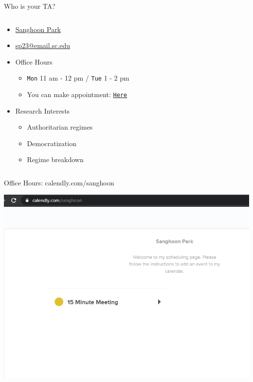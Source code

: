 \documentclass[xcolor=dvipsnames]{beamer}
\begin{document}
\begin{frame}[fragile]{Who is your TA?}
\begin{columns}[T]
			\begin{column}{0.6\textwidth}
				\begin{itemize}
					\item \href{shpark.netlify.app}{Sanghoon Park}
					\item \href{sp23@email.sc.edu}{sp23@email.sc.edu}
					\item Office Hours
					\begin{itemize}
						\item \texttt{Mon} 11 am - 12 pm / \texttt{Tue} 1 - 2 pm
						\item You can make appointment: \href{https://calendly.com/sanghoon}{\texttt{Here}}
					\end{itemize}
					\item Research Interests
					\begin{itemize} 
						\item Authoritarian regimes
						\item Democratization
						\item Regime breakdown
					\end{itemize}
				\end{itemize}
			\end{column}
		\end{columns}
	\end{frame}
	
	\begin{frame}[fragile]{Office Hours: calendly.com/sanghoon}
		\begin{center}	\includegraphics[width=0.7\linewidth]{officehours1.png} \end{center}
	\end{frame}
	
\end{document}
